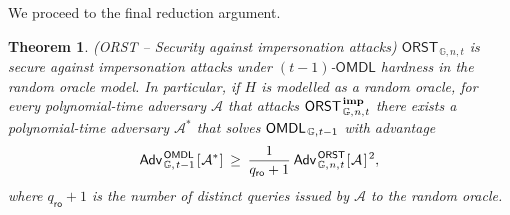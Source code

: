 \documentclass[10pt, psamsfonts, reqno]{amsart}
\newtheorem{thm}{Theorem}[section]
\theoremstyle{definition}
\theoremstyle{remark}
\numberwithin{equation}{section}
\begin{document}
\noindent
We proceed to the final reduction argument.

\begin{thm}\label{theorem_orst_security}
\textup{(\textsf{ORST} --
\textit{Security against impersonation attacks})}
$\mathsf{ORST}_{\hspace{1pt}\mathbb{G}, n, t}$
is secure against impersonation attacks
under $(t-1)$-$\mathsf{OMDL}$ hardness
in the random oracle model.
In particular, if $H$ is modelled as a random oracle,
for every polynomial-time adversary $\mathcal{A}$ that attacks
$\mathsf{ORST}
	_{\hspace{1pt}\mathbb{G},\hspace{0.5pt} n,\hspace{0.5pt} t}
	^\mathbf{\hspace{1pt}imp}
$
there exists a polynomial-time
adversary $\mathcal{A}^*$ that solves
$\mathsf{OMDL}
	_{\hspace{1pt}\mathbb{G},\hspace{0.5pt} t-1}
$
with advantage
\vspace{5pt}
\begin{equation}\label{orst_security_bound}
	\mathsf{Adv}
		_{\hspace{1pt}\mathbb{G},\hspace{1pt} t-1}
		^{\hspace{1pt}\mathsf{OMDL}}
		\hspace{1pt}
		[
			\hspace{0.5pt}
			\mathcal{A}^*
			\hspace{0.5pt}
		]
	\hspace{2pt}
	\ge
	\hspace{2pt}
	\frac{1}{q_{\mathsf{ro}} + 1}
	\hspace{2pt}
	\mathsf{Adv}
		_{\hspace{1pt}\mathbb{G}, \hspace{0.5pt}n, \hspace{0.5pt}t}
		^{\hspace{1pt}\mathsf{ORST}}
		\hspace{0.5pt}
		[
			\hspace{0.5pt}
			\mathcal{A}
			\hspace{1pt}
		] ^ {\hspace{1pt}2},
\vspace{5pt}
\end{equation}
where $q_\mathsf{ro} + 1$ is the number of distinct queries
issued by $\mathcal{A}$ to the random oracle.
\end{thm}
\end{document}
